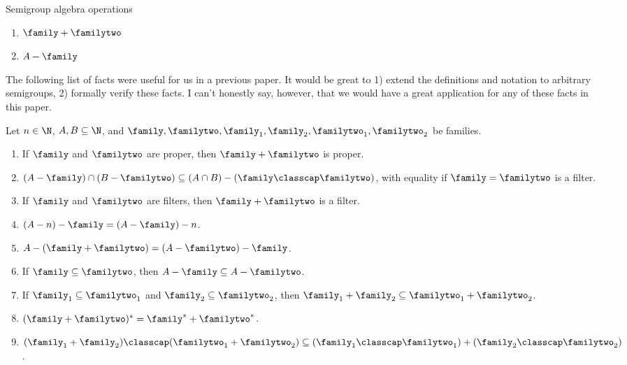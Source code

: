 Semigroup algebra operations
\begin{enumerate}
    \item $\family + \familytwo$
    \item $A - \family$
\end{enumerate}
\vskip0.5cm


The following list of facts were useful for us in a previous paper.  It would be great to 1) extend the definitions and notation to arbitrary semigroups, 2) formally verify these facts.  I can't honestly say, however, that we would have a great application for any of these facts in this paper.

Let $n \in \N$, $A, B \subseteq \N$, and $\family, \familytwo, \family_1, \family_2, \familytwo_1, \familytwo_2$ be families.
\begin{enumerate}
    \item
    \label{item_family_prop_zero}
    If $\family$ and $\familytwo$ are proper, then $\family + \familytwo$ is proper.
    
    \item
    \label{item_family_prop_one_new}
    $(A - \family) \cap (B - \familytwo) \subseteq (A \cap B) - (\family \classcap \familytwo)$, with equality if $\family = \familytwo$ is a filter.

    \item \label{item_family_prop_two}
    If $\family$ and $\familytwo$ are filters, then $\family + \familytwo$ is a filter.

    \item \label{item_family_prop_three}
    $(A -n) - \family = (A - \family) - n$.

    \item \label{item_family_prop_four}
    $A - (\family + \familytwo) = (A - \familytwo) - \family$.

    \item \label{item_family_diff_containment}
    If $\family \subseteq \familytwo$, then $A - \family \subseteq A - \familytwo$.
    
    \item \label{item_filter_sums_containment}
    If $\family_1 \subseteq \familytwo_1$ and $\family_2 \subseteq \familytwo_2$, then $\family_1 + \family_2 \subseteq \familytwo_1 + \familytwo_2$.

    \item \label{item_sum_dual}
    $(\family + \familytwo)^* = \family^* + \familytwo^*$.

    \item \label{item_cap_sums}
    $(\family_1 + \family_2) \classcap (\familytwo_1 + \familytwo_2) \subseteq (\family_1 \classcap \familytwo_1) + (\family_2 \classcap \familytwo_2)$.
\end{enumerate}



